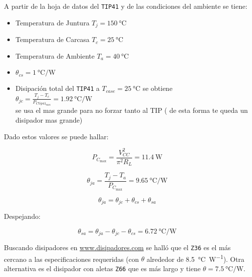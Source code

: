 	A partir de la hoja de datos del \texttt{TIP41} y de las condiciones del ambiente se tiene:
	\begin{itemize}
		\item  Temperatura de Juntura $T_j = \SI{150}{\celsius} $
		\item  Temperatura de Carcasa $T_c = \SI{25}{\celsius} $
		\item  Temperatura de Ambiente $T_a = \SI{40}{\celsius} $
		\item  $\theta_{cs} = \SI{1}{\celsius\per\W}$ 
		\item  Disipación total del \texttt{TIP41} a $T_{case} = \SI{25}{\celsius}$ se obtiene $\theta_{jc} =  \frac{T_j - T_c}{P_{Ctip41_{\max}}} =\SI{1.92}{\celsius\per\W}$ 
		\\	se usa el mas grande para no forzar tanto al TIP ( de esta forma te queda un disipador mas grande)
	\end{itemize}

	Dado estos valores se puede hallar:

	\begin{equation}
		P_{C_{\max}} = \frac{V^2_{CC}}{\pi^2 R_L} = \SI{11.4}{\W}
	\end{equation}

	\begin{equation}
		\theta_{ja} =  \frac{T_j - T_a}{P_{C_{\max}}} =\SI{9.65}{\celsius\per\W}
	\end{equation}
	

	\begin{equation}
		\theta_{ja} = \theta_{jc} + \theta_{cs} + \theta_{sa}
	\end{equation}

	Despejando:

	\begin{equation}
		\theta_{sa} = \theta_{ja} - \theta_{jc} - \theta_{cs} = \boxed{\SI{6.72}{\celsius\per\W}}
	\end{equation}

	Buscando disipadores en \url{www.disipadores.com} se halló que el \texttt{Z36} es el más cercano a las especificaciones requeridas (con $\theta$ alrededor de \SI{8.5}{\celsius\per\W}). Otra alternativa es el disipador con aletas \texttt{Z66} que es más largo y tiene $\theta = \SI{7.5}{\celsius\per\W}$.


